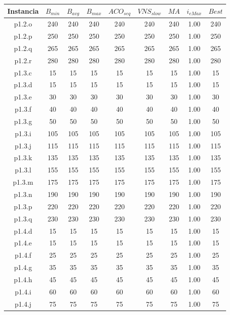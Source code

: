 \begin{table}
\begin{center}
\begin{tabular}{ |c|c|c|c|c|c|c|c|c| } 
\hline
Instancia & $B_{min}$ & $B_{avg}$ & $B_{max}$ & $ACO_{seq}$ & $VNS_{slow}$ & $MA$ & $i_{eMax}$ & $Best$ \\
\hline
p1.2.o & 240 & 240 & 240 & 240 & 240 & 240 & 1.00 & 240 \\
p1.2.p & 250 & 250 & 250 & 250 & 250 & 250 & 1.00 & 250 \\
p1.2.q & 265 & 265 & 265 & 265 & 265 & 265 & 1.00 & 265 \\
p1.2.r & 280 & 280 & 280 & 280 & 280 & 280 & 1.00 & 280 \\
p1.3.c & 15 & 15 & 15 & 15 & 15 & 15 & 1.00 & 15 \\
p1.3.d & 15 & 15 & 15 & 15 & 15 & 15 & 1.00 & 15 \\
p1.3.e & 30 & 30 & 30 & 30 & 30 & 30 & 1.00 & 30 \\
p1.3.f & 40 & 40 & 40 & 40 & 40 & 40 & 1.00 & 40 \\
p1.3.g & 50 & 50 & 50 & 50 & 50 & 50 & 1.00 & 50 \\
p1.3.i & 105 & 105 & 105 & 105 & 105 & 105 & 1.00 & 105 \\
p1.3.j & 115 & 115 & 115 & 115 & 115 & 115 & 1.00 & 115 \\
p1.3.k & 135 & 135 & 135 & 135 & 135 & 135 & 1.00 & 135 \\
p1.3.l & 155 & 155 & 155 & 155 & 155 & 155 & 1.00 & 155 \\
p1.3.m & 175 & 175 & 175 & 175 & 175 & 175 & 1.00 & 175 \\
p1.3.n & 190 & 190 & 190 & 190 & 190 & 190 & 1.00 & 190 \\
p1.3.p & 220 & 220 & 220 & 220 & 220 & 220 & 1.00 & 220 \\
p1.3.q & 230 & 230 & 230 & 230 & 230 & 230 & 1.00 & 230 \\
p1.4.d & 15 & 15 & 15 & 15 & 15 & 15 & 1.00 & 15 \\
p1.4.e & 15 & 15 & 15 & 15 & 15 & 15 & 1.00 & 15 \\
p1.4.f & 25 & 25 & 25 & 25 & 25 & 25 & 1.00 & 25 \\
p1.4.g & 35 & 35 & 35 & 35 & 35 & 35 & 1.00 & 35 \\
p1.4.h & 45 & 45 & 45 & 45 & 45 & 45 & 1.00 & 45 \\
p1.4.i & 60 & 60 & 60 & 60 & 60 & 60 & 1.00 & 60 \\
p1.4.j & 75 & 75 & 75 & 75 & 75 & 75 & 1.00 & 75 \\

\end{tabular}
\end{center}
\end{table}
